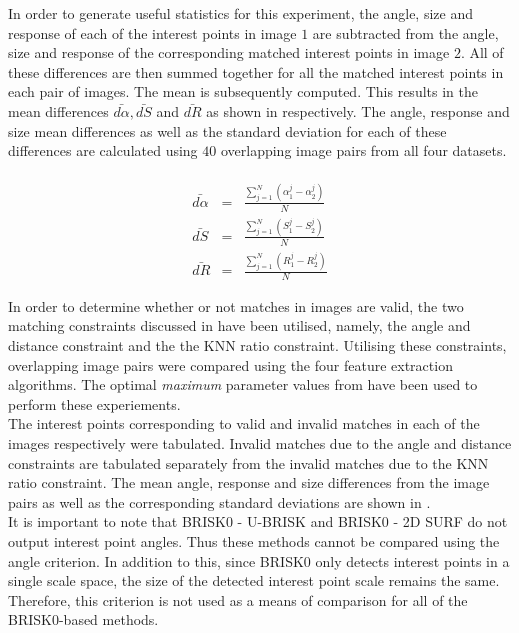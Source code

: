 \documentclass{article}
\begin{document}
In order to generate useful statistics for this experiment, the angle, size and response of each of the interest points in image $1$ are subtracted from the angle, size and response of the corresponding matched interest points in image $2$. All of these differences are then summed together for all the matched interest points in each pair of images. The mean is subsequently computed. This results in the mean differences $\bar{d\alpha}, \bar{dS}$ and $\bar{dR}$ as shown in  respectively. The angle, response and size mean differences as well as the standard deviation for each of these differences are calculated using $40$ overlapping image pairs from all four datasets.\\ \\

\begin{eqnarray}
\bar{d\alpha} &=& \frac{\sum_{j=1}^N (\alpha_1^j - \alpha_2^j)}{N}\\
\bar{dS} &=& \frac{\sum_{j=1}^N (S_1^j - S_2^j)}{N}\\
\bar{dR} &=& \frac{\sum_{j=1}^N (R_1^j - R_2^j)}{N}
\label{eqn:differenceProperties}
\end{eqnarray}

In order to determine whether or not matches in images are valid, the two matching constraints discussed in  have been utilised, namely, the angle and distance constraint and the the KNN ratio constraint. Utilising these constraints, overlapping image pairs were compared using the four feature extraction algorithms. The optimal \textit{maximum} parameter values from  have been used to perform these experiements. \\

The interest points corresponding to valid and invalid matches in each of the images respectively were tabulated. Invalid matches due to the angle and distance constraints are tabulated separately from the invalid matches due to the KNN ratio constraint. The mean angle, response and size differences from the image pairs as well as the corresponding standard deviations are shown in .\\

It is important to note that BRISK0 - U-BRISK and BRISK0 - 2D SURF do not output interest point angles. Thus these methods cannot be compared using the angle criterion. In addition to this, since BRISK0 only detects interest points in a single scale space, the size of the detected interest point scale remains the same. Therefore, this criterion is not used as a means of comparison for all of the BRISK0-based methods.\\
\end{document}
